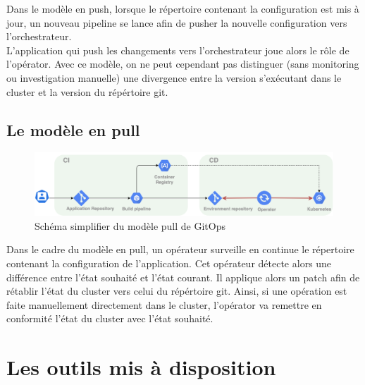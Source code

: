 \documentclass[11pt,fleqn]{book} %
\begin{document}
Dans le modèle en push, lorsque le répertoire contenant la configuration est mis à jour, un nouveau pipeline se lance afin de pusher la nouvelle configuration vers l'orchestrateur.\\
L'application qui push les changements vers l'orchestrateur joue alors le rôle de l'opérator. Avec ce modèle, on ne peut cependant pas distinguer (sans monitoring ou investigation manuelle) une divergence entre la version s'exécutant dans le cluster et la version du répértoire git. 

\subsection{Le modèle en pull}
\begin{figure}[H]
\renewcommand{\figurename}{Graphique}
\hspace{-2cm}
\includegraphics[scale=0.5]{Pictures/CI-CD/gitops-pull.png}
\captionsetup{margin=1.5cm,format=hang,justification=justified}
\caption[]{Schéma simplifier du modèle pull de GitOps \newline}
\end{figure}

Dans le cadre du modèle en pull, un opérateur surveille en continue le répertoire contenant la configuration de l'application. Cet opérateur détecte alors une différence entre l'état souhaité et l'état courant. Il applique alors un patch afin de rétablir l'état du cluster vers celui du répértoire git. Ainsi, si une opération est faite manuellement directement dans le cluster, l'opérator va remettre en conformité l'état du cluster avec l'état souhaité.


\section{Les outils mis à disposition}
\end{document}
